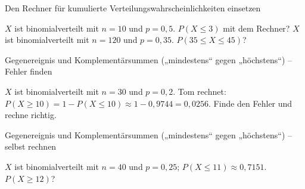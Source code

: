 \begin{aufgabe}{Den Rechner für kumulierte Verteilungswahrscheinlichkeiten einsetzen}
\begin{teile}
\teil $X$ ist binomialverteilt mit $n = 10$ und $p = 0{,}5$. $P(X \le 3)$ mit dem Rechner?
\teil $X$ ist binomialverteilt mit $n = 120$ und $p = 0{,}35$. $P(35 \le X \le 45)$?
\end{teile}
\end{aufgabe}

\begin{aufgabe}{Gegenereignis und Komplementärsummen („mindestens“ gegen „höchstens“) – Fehler finden}
\begin{teile}
\teil $X$ ist binomialverteilt mit $n = 30$ und $p = 0{,}2$. Tom rechnet: $P(X \ge 10) = 1 - P(X \le 10) \approx 1 - 0{,}9744 = 0{,}0256$. Finde den Fehler und rechne richtig.
\end{teile}
\end{aufgabe}

\begin{aufgabe}{Gegenereignis und Komplementärsummen („mindestens“ gegen „höchstens“) – selbst rechnen}
\begin{teile}
\teil $X$ ist binomialverteilt mit $n = 40$ und $p = 0{,}25$; $P(X \le 11) \approx 0{,}7151$. $P(X \ge 12)$?
\end{teile}
\end{aufgabe}
